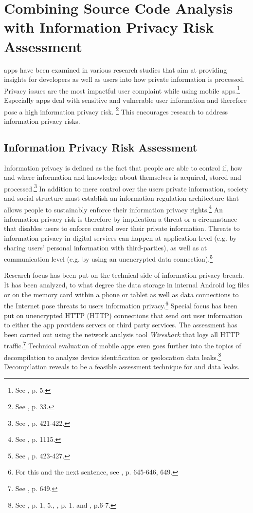 \section{Combining Source Code Analysis with Information Privacy Risk Assessment}

\mH apps have been examined in various research studies that aim at providing insights for developers as well as users into how private information is processed.
Privacy issues are the most impactful user complaint while using mobile apps.\footnote{See \cite{Khalid2015}, p. 5.}
Especially \mH apps deal with sensitive and vulnerable user information and therefore pose a high information privacy risk. \footnote{See \cite{Kumar2013}, p. 33.}
This encourages research to address information privacy risks.

\subsection{Information Privacy Risk Assessment}

Information privacy is defined as the fact that people are able to control if, how and where information and knowledge about themselves is acquired, stored and processed.\footnote{See \cite{Fischer1998}, p. 421-422.}
In addition to mere control over the users private information, society and social structure must establish an information regulation architecture that allows people to sustainably enforce their information privacy rights.\footnote{See \cite{Solove2002}, p. 1115.}
An information privacy risk is therefore by implication a threat or a circumstance that disables users to enforce control over their private information.
Threats to information privacy in digital services can happen at application level (e.g. by sharing users' personal information with third-parties), as well as at communication level (e.g. by using an unencrypted data connection).\footnote{See \cite{Fischer1998}, p. 423-427.}

Research focus has been put on the technical side of information privacy breach. 
It has been analyzed, to what degree the data storage in internal Android log files or on the memory card within a phone or tablet as well as data connections to the Internet pose threats to users information privacy.\footnote{For this and the next sentence, see \cite{He2014}, p. 645-646, 649.}
Special focus has been put on unencrypted \acl{HTTP} (\acs{HTTP}) connections that send out user information to either the app providers servers or third party services.
The assessment has been carried out using the network analysis tool \textit{Wireshark} that logs all HTTP traffic.\footnote{See \cite{He2014}, p. 649.}
Technical evaluation of mobile apps even goes further into the topics of decompilation to analyze device identification or geolocation data leaks.\footnote{See \cite{Mcclurg2012}, p. 1, 5., \cite{Enck2011}, p. 1. and \cite{Mitchell2013}, p.6-7.}
Decompilation reveals to be a feasible assessment technique for \ipr and data leaks.

